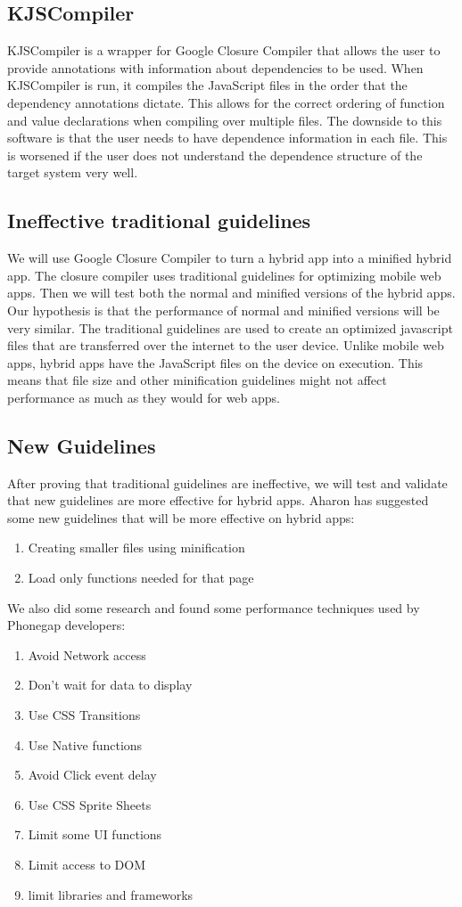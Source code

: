 \documentclass{acm_proc_article-sp}
\begin{document}
\subsection{KJSCompiler}
KJSCompiler is a wrapper for Google Closure Compiler that allows the user to provide annotations with information about dependencies to be used.
When KJSCompiler is run, it compiles the JavaScript files in the order that the dependency annotations dictate.
This allows for the correct ordering of function and value declarations when compiling over multiple files.
The downside to this software is that the user needs to have dependence information in each file. 
This is worsened if the user does not understand the dependence structure of the target system very well. 


\subsection{Ineffective traditional guidelines}
We will use Google Closure Compiler to turn a hybrid app into a minified hybrid app.
The closure compiler uses traditional guidelines for optimizing mobile web apps.
Then we will test both the normal and minified versions of the hybrid apps.
Our hypothesis is that the performance of normal and minified versions will be very similar.
The traditional guidelines are used to create an optimized javascript files that are transferred over the internet to the user device.
Unlike mobile web apps, hybrid apps have the JavaScript files on the device on execution.
This means that file size and other minification guidelines might not affect performance as much as they would for web apps.


\subsection{New Guidelines}
After proving that traditional guidelines are ineffective, we will test and validate that new guidelines are more effective for hybrid apps.
Aharon has suggested some new guidelines that will be more effective on hybrid apps:
\begin{enumerate}
	\item Creating smaller files using minification
	\item Load only functions needed for that page
\end{enumerate}

We also did some research and found some performance techniques used by Phonegap developers:
\begin{enumerate}
	\item Avoid Network access
	\item Don't wait for data to display
	\item Use CSS Transitions
	\item Use Native functions
	\item Avoid Click event delay
	\item Use CSS Sprite Sheets
	\item Limit some UI functions
	\item Limit access to DOM
	\item limit libraries and frameworks
\end{enumerate}
\end{document}
